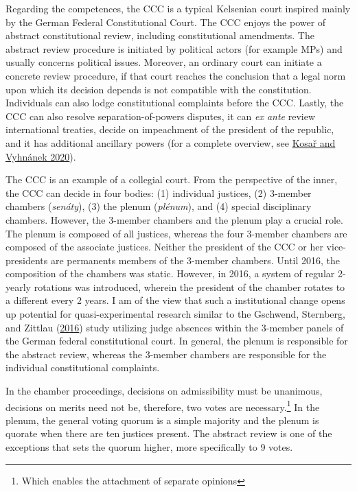 \documentclass[
  11pt,
]{article}
\begin{document}
Regarding the competences, the CCC is a typical Kelsenian court inspired
mainly by the German Federal Constitutional Court. The CCC enjoys the
power of abstract constitutional review, including constitutional
amendments. The abstract review procedure is initiated by political
actors (for example MPs) and usually concerns political issues.
Moreover, an ordinary court can initiate a concrete review procedure, if
that court reaches the conclusion that a legal norm upon which its
decision depends is not compatible with the constitution. Individuals
can also lodge constitutional complaints before the CCC. Lastly, the CCC
can also resolve separation-of-powers disputes, it can \emph{ex ante}
review international treaties, decide on impeachment of the president of
the republic, and it has additional ancillary powers (for a complete
overview, see
\protect\hyperlink{ref-kosarConstitutionalCourtCzechia2020}{Kosař and
Vyhnánek 2020}).

The CCC is an example of a collegial court. From the perspective of the
inner, the CCC can decide in four bodies: (1) individual justices, (2)
3-member chambers (\emph{senáty}), (3) the plenum (\emph{plénum}), and
(4) special disciplinary chambers. However, the 3-member chambers and
the plenum play a crucial role. The plenum is composed of all justices,
whereas the four 3-member chambers are composed of the associate
justices. Neither the president of the CCC or her vice-presidents are
permanents members of the 3-member chambers. Until 2016, the composition
of the chambers was static. However, in 2016, a system of regular
2-yearly rotations was introduced, wherein the president of the chamber
rotates to a different every 2 years. I am of the view that such a
institutional change opens up potential for quasi-experimental research
similar to the Gschwend, Sternberg, and Zittlau
(\protect\hyperlink{ref-gschwendAreJudgesPolitical2016}{2016}) study
utilizing judge absences within the 3-member panels of the German
federal constitutional court. In general, the plenum is responsible for
the abstract review, whereas the 3-member chambers are responsible for
the individual constitutional complaints.

In the chamber proceedings, decisions on admissibility must be
unanimous, decisions on merits need not be, therefore, two votes are
necessary.\footnote{Which enables the attachment of separate opinions}
In the plenum, the general voting quorum is a simple majority and the
plenum is quorate when there are ten justices present. The abstract
review is one of the exceptions that sets the quorum higher, more
specifically to 9 votes.
\end{document}
